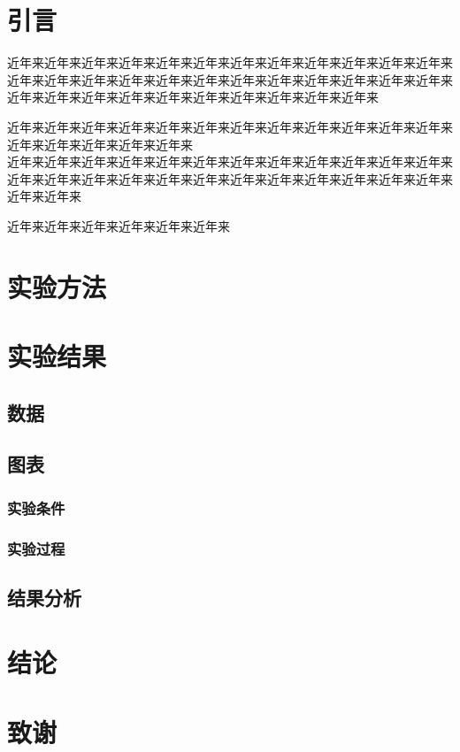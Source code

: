 \documentclass{ctexbook}
\begin{document}
    \section{引言}  %
    近年来近年来近年来近年来近年来近年来近年来近年来近年来近年来近年来近年来近年来近年来近年来近年来近年来近年来近年来近年来近年来近年来近年来近年来近年来近年来近年来近年来近年来近年来近年来近年来近年来近年来

    近年来近年来近年来近年来近年来近年来近年来近年来近年来近年来近年来近年来近年来近年来近年来近年来近年来\\近年来近年来近年来近年来近年来近年来近年来近年来近年来近年来近年来近年来近年来近年来近年来近年来近年来近年来近年来近年来近年来近年来近年来近年来近年来近年来\par 近年来近年来近年来近年来近年来近年来
    \section{实验方法}
    \section{实验结果}
    \subsection{数据}
    \subsection{图表}
    \subsubsection{实验条件}
    \subsubsection{实验过程}
    \subsection{结果分析}
    \section{结论}
    \section{致谢}
\end{document}
